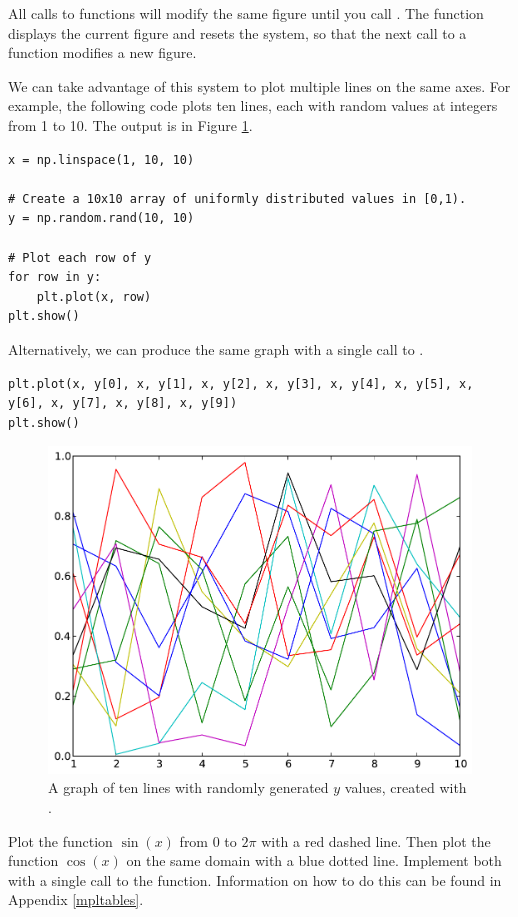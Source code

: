 All calls to  functions will modify the same figure until you call . 
The function  displays the current figure and resets the system, so that the next call to a  function modifies a new figure. 

We can take advantage of this system to plot multiple lines on the same axes.
For example, the following code plots ten lines, each with random values at integers from 1 to 10. 
The output is in Figure \ref{fig:statemachine}.
\begin{lstlisting}
x = np.linspace(1, 10, 10)

# Create a 10x10 array of uniformly distributed values in [0,1).
y = np.random.rand(10, 10)

# Plot each row of y
for row in y:
    plt.plot(x, row)
plt.show()
\end{lstlisting}

Alternatively, we can produce the same graph with a single call to .
\begin{lstlisting}
plt.plot(x, y[0], x, y[1], x, y[2], x, y[3], x, y[4], x, y[5], x, y[6], x, y[7], x, y[8], x, y[9])
plt.show()
\end{lstlisting}


\begin{figure}
\centering
\includegraphics[width=\textwidth]{statemachine.pdf}
\caption{A graph of ten lines with randomly generated $y$ values, created with .}
\label{fig:statemachine}
\end{figure}


\begin{problem} Plot the function $\sin(x)$ from $0$ to $2\pi$ with a red dashed line.
Then plot the function $\cos(x)$ on the same domain with a blue dotted line.
Implement both with a single call to the  function.
Information on how to do this can be found in Appendix \ref{mpltables}.
\end{problem}

